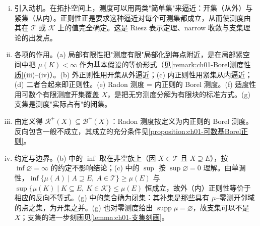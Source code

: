 \documentclass[../../main.tex]{subfiles}%
\begin{document}
\begin{remark}\label{remark:ch01-Borel测度动机}
\begin{enumerate}[(i)]
\item 引入动机。在拓扑空间上，测度可以用两类"简单集"来逼近：开集（从外）与紧集（从内）。正则性正是要求这种逼近对每个可测集都成立，从而使测度由其在 $\mathcal{T}$ 或 $\mathcal{K}$ 上的值完全确定。这是 Riesz 表示定理、narrow 收敛与支集理论的出发点。
\item 各项的作用。(a) 局部有限性把"测度有限"局部化到每点附近，是在局部紧空间中把 $\mu(K)<\infty$ 作为基本假设的等价形式（见\cref{remark:ch01-Borel测度性质}(iii)--(iv)）。(b) 外正则性用开集从外逼近；(c) 内正则性用紧集从内逼近；(d) 二者合起来即正则性。(e) Radon 测度 = 内正则的 Borel 测度。(f) 适度性用可数个有限测度开集覆盖 $X$，是把无穷测度分解为有限块的标准方式。(g) 支集是测度"实际占有"的闭集。
\item 由定义得 $\mathcal{R}^+(X)\subseteq\mathcal{B}^+(X)$：Radon 测度按定义为内正则的 Borel 测度。反向包含一般不成立，其成立的充分条件见\cref{proposition:ch01-可数基Borel正则}。
\item 约定与边界。(b) 中的 $\inf$ 取在非空族上（因 $X\in\mathcal{T}$ 且 $X\supseteq E$），按 $\inf\varnothing=\infty$ 的约定不影响结论；(c) 中的 $\sup$ 按 $\sup\varnothing=0$ 理解。由单调性，$\inf\{\mu(A)\mid A\supseteq E,\ A\in\mathcal{T}\}\geqslant\mu(E)$ 与 $\sup\{\mu(K)\mid K\subseteq E,\ K\in\mathcal{K}\}\leqslant\mu(E)$ 恒成立，故外（内）正则性等价于相应的反向不等式。(g) 中的集合确为闭集：其补集是那些具有 $\mu$--零测开邻域的点之集，为开集之并。(g) 也对零测度给出 $\operatorname{supp}\mu=\varnothing$，故支集可以不是 $X$；支集的进一步刻画见\cref{lemma:ch01-支集刻画}。
\end{enumerate}
\end{remark}
\end{document}
